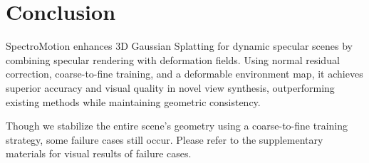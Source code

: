 \section{Conclusion}
\label{sec:conclusion}
SpectroMotion enhances 3D Gaussian Splatting for dynamic specular scenes by combining specular rendering with deformation fields. Using normal residual correction, coarse-to-fine training, and a deformable environment map, it achieves superior accuracy and visual quality in novel view synthesis, outperforming existing methods while maintaining geometric consistency.

\vspace{3pt}  
Though we stabilize the entire scene's geometry using a coarse-to-fine training strategy, some failure cases still occur. Please refer to the supplementary materials for visual results of failure cases.
